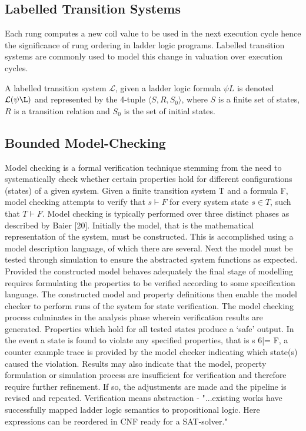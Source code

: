 \documentclass[runningheads]{llncs}
\begin{document}
\subsection{Labelled Transition Systems}
Each rung computes a new coil value to be used in the next execution cycle hence the significance of rung ordering in ladder logic programs. Labelled transition systems are commonly used to model this change in valuation over execution cycles.
\begin{definition}
	A labelled transition system $\mathcal{L}$, given a ladder logic formula $\psi L$ is denoted $\mathcal{L(\psi\L)}$ and represented by the 4-tuple $\langle S, R, S_0 \rangle$, where $S$ is a finite set of states, $R$ is a transition relation and $S_0$ is the set of initial states. 
\end{definition}

\subsection{Bounded Model-Checking}
Model checking is a formal verification technique stemming from the need to systematically
check whether certain properties hold for different configurations (states) of a given system.
Given a finite transition system T and a formula F, model checking attempts to verify
that $s \vdash F$ for every system state $s \in T$, such that $T \vdash F$. Model checking is typically
performed over three distinct phases as described by Baier [20]. Initially the model, that is
the mathematical representation of the system, must be constructed. This is accomplished
using a model description language, of which there are several. Next the model must
be tested through simulation to ensure the abstracted system functions as expected.
Provided the constructed model behaves adequately the final stage of modelling requires
formulating the properties to be verified according to some specification language. The
constructed model and property definitions then enable the model checker to perform runs
of the system for state verification. The model checking process culminates in the analysis
phase wherein verification results are generated. Properties which hold for all tested states
produce a ‘safe’ output. In the event a state is found to violate any specified properties, that
is s 6|= F, a counter example trace is provided by the model checker indicating which state(s)
caused the violation. Results may also indicate that the model, property formulation or
simulation process are insufficient for verification and therefore require further refinement.
If so, the adjustments are made and the pipeline is revised and repeated.
Verification means abstraction -  "...existing works have successfully mapped ladder logic semantics to propositional logic. Here expressions can be reordered in CNF ready for a SAT-solver."
\end{document}
